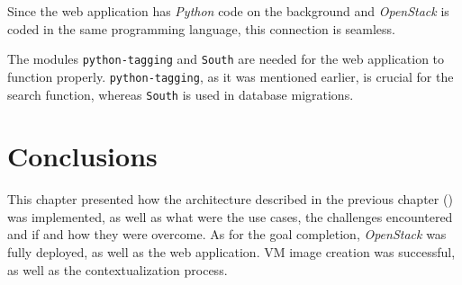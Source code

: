 Since the web application has \textit{Python} code on the background and \textit{OpenStack} is coded in the same programming language, this connection is seamless.

The modules \texttt{python-tagging} and \texttt{South} are needed for the web application to function properly. \texttt{python-tagging}, as it was mentioned earlier, is crucial for the search function, whereas \texttt{South} is used in database migrations.
\section{Conclusions}

This chapter presented how the architecture described in the previous chapter () was implemented, as well as what were the use cases, the challenges encountered and if and how they were overcome. 
As for the goal completion, \textit{OpenStack} was fully deployed, as well as the web application. VM image creation was successful, as well as the contextualization process.
